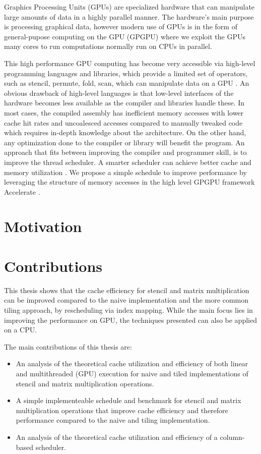 Graphics Processing Units (GPUs) are specialized hardware that can manipulate large amounts of data in a highly parallel manner.
The hardware's main purpose is processing graphical data, however modern use of GPUs is in the form of general-pupose computing on the GPU (GPGPU) where we exploit the GPUs many cores to run computations normally run on CPUs in parallel.

This high performance GPU computing has become very accessible via high-level programming languages and libraries, which provide a limited set of operators, such as stencil, permute, fold, scan, which can manipulate data on a GPU \cite{chakravarty2011accelerating}.
An obvious drawback of high-level languages is that low-level interfaces of the hardware becomes less available as the compiler and libraries handle these.
In most cases, the compiled assembly has inefficient memory accesses with lower cache hit rates and uncoalesced accesses compared to manually tweaked code which requires in-depth knowledge about the architecture.
On the other hand, any optimization done to the compiler or library will benefit the program.
An approach that fits between improving the compiler and programmer skill, is to improve the thread scheduler.
A smarter scheduler can achieve better cache and memory utilization \cite{nugteren2014study}.
We propose a simple schedule to improve performance by leveraging the structure of memory accesses in the high level GPGPU framework Accelerate \cite{chakravarty2011accelerating}.

\section{Motivation}

\section{Contributions}
This thesis shows that the cache efficiency for stencil and matrix multiplication can be improved compared to the naive implementation and the more common tiling approach, by rescheduling via index mapping.
While the main focus lies in improving the performance on GPU, the techniques presented can also be applied on a CPU.

\vspace{1em}
The main contributions of this thesis are:
\begin{itemize}
    \item An analysis of the theoretical cache utilization and efficiency of both linear and multithreaded (GPU) execution for naive and tiled implementations of stencil and matrix multiplication operations.
    \item A simple implementeable schedule and benchmark for stencil and matrix multiplication operations that improve cache efficiency and therefore performance compared to the naive and tiling implementation.
    \item An analysis of the theoretical cache utilization and efficiency of a column-based scheduler.
\end{itemize}

